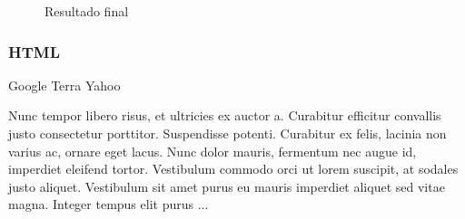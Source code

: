 \documentclass[letterpaper,10pt,spanish]{sphinxmanual}
\begin{document}
\begin{figure}[htbp]
\centering
\capstart

\noindent{}
\caption{Resultado final}\label{\detokenize{tema3:id6}}\end{figure}


\subsubsection{HTML}
\label{\detokenize{tema3:html}}
\begin{sphinxVerbatim}[commandchars=\\\{\}]
     
             
                Google
             
                Terra
             
                Yahoo
 

            Nunc tempor libero risus, et ultricies ex auctor a. Curabitur efficitur convallis justo consectetur porttitor. Suspendisse potenti. Curabitur ex felis, lacinia non varius ac, ornare eget lacus. Nunc dolor mauris, fermentum nec augue id, imperdiet eleifend tortor. Vestibulum commodo orci ut lorem suscipit, at sodales justo aliquet. Vestibulum sit amet purus eu mauris imperdiet aliquet sed vitae magna. Integer tempus elit purus ...

             
\end{sphinxVerbatim}
\end{document}
